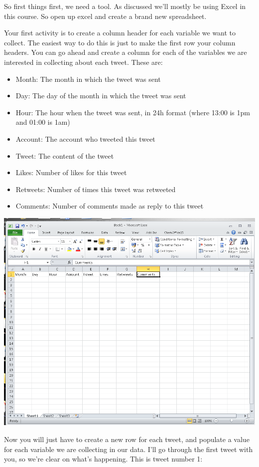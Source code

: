 \documentclass[]{book}
\providecommand{\tightlist}{%
  \setlength{\itemsep}{0pt}\setlength{\parskip}{0pt}}
\theoremstyle{definition}
\theoremstyle{definition}
\theoremstyle{definition}
\theoremstyle{remark}
\begin{document}
So first things first, we need a tool. As discussed we'll mostly be
using Excel in this course. So open up excel and create a brand new
spreadsheet.

Your first activity is to create a column header for each variable we
want to collect. The easiest way to do this is just to make the first
row your column headers. You can go ahead and create a column for each
of the variables we are interested in collecting about each tweet. These
are:

\begin{itemize}
\tightlist
\item
  Month: The month in which the tweet was sent
\item
  Day: The day of the month in which the tweet was sent
\item
  Hour: The hour when the tweet was sent, in 24h format (where 13:00 is
  1pm and 01:00 is 1am)
\item
  Account: The account who tweeted this tweet
\item
  Tweet: The content of the tweet
\item
  Likes: Number of likes for this tweet
\item
  Retweets: Number of times this tweet was retweeted
\item
  Comments: Number of comments made as reply to this tweet
\end{itemize}

\includegraphics{imgs/column_headers_tweets.png}

Now you will just have to create a new row for each tweet, and populate
a value for each variable we are collecting in our data. I'll go through
the first tweet with you, so we're clear on what's happening. This is
tweet number 1:
\end{document}

